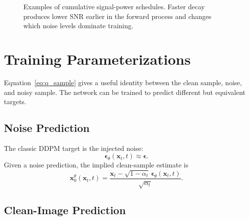 \documentclass[11pt]{article}
\newcommand{\bx}{\mathbf{x}}
\newcommand{\beps}{\boldsymbol{\epsilon}}
\begin{document}
\begin{figure}[t]
  \centering
  \caption{Examples of cumulative signal-power schedules.  Faster decay produces lower SNR earlier in the forward process and changes which noise levels dominate training.}
  \label{fig:alpha_schedules}
\end{figure}

\section{Training Parameterizations}

Equation~\eqref{eq:q_sample} gives a useful identity between the clean sample, noise, and noisy sample.
The network can be trained to predict different but equivalent targets.

\subsection{Noise Prediction}

The classic DDPM target is the injected noise:
\begin{equation}
  \beps_\theta(\bx_t,t) \approx \beps.
  \label{eq:eps_prediction}
\end{equation}
Given a noise prediction, the implied clean-sample estimate is
\begin{equation}
  \bx_0^\theta(\bx_t,t)
  =
  \frac{\bx_t-\sqrt{1-\alpha_t}\,\beps_\theta(\bx_t,t)}{\sqrt{\alpha_t}}.
  \label{eq:x0_from_eps}
\end{equation}

\subsection{Clean-Image Prediction}
\end{document}

